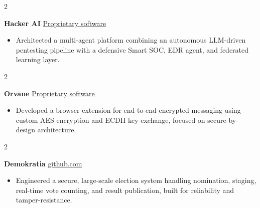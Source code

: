 \documentclass[10pt, a4paper]{article}
\newenvironment{highlights}{
    \begin{itemize}[
        topsep=0.10 cm,
        parsep=0.10 cm,
        partopsep=0pt,
        itemsep=0pt,
        leftmargin=0 cm + 10pt
    ]
}{
    \end{itemize}
} %
\newenvironment{twocolentry}[2][]{
    \onecolentry
    \def\secondColumn{#2}
    \setcolumnwidth{\fill, 4.5 cm}
    \begin{paracol}{2}
}{
    \switchcolumn \raggedleft \secondColumn
    \end{paracol}
    \endonecolentry
} %
\begin{document}
        \vspace{0.01 cm}

            \begin{twocolentry}{
            \href{https://github.com/TimsTittus/Hacker-AI}{\underline{Proprietary software}}
        }
            \textbf{Hacker AI}\end{twocolentry}

        \vspace{0.01 cm}

            \begin{highlights}
                \item Architected a multi-agent platform combining an autonomous LLM-driven pentesting pipeline with a defensive Smart SOC, EDR agent, and federated learning layer.
            \end{highlights}

        \vspace{0.01 cm}

        \begin{twocolentry}{
            \href{https://github.com/TimsTittus/Orvane}{\underline{Proprietary software}}
        }
            \textbf{Orvane}\end{twocolentry}

        \vspace{0.01 cm}

            \begin{highlights}
                \item Developed a browser extension for end-to-end encrypted messaging using custom AES encryption and ECDH key exchange, focused on secure-by-design architecture.
            \end{highlights}

        \vspace{0.01 cm}

            \begin{twocolentry}{
            \href{https://github.com/TimsTittus/Demokratia}{\underline{github.com}}
        }
            \textbf{Demokratia}\end{twocolentry}

        \vspace{0.01 cm}

            \begin{highlights}
                \item Engineered a secure, large-scale election system handling nomination, staging, real-time vote counting, and result publication, built for reliability and tamper-resistance.
            \end{highlights}
\end{document}
